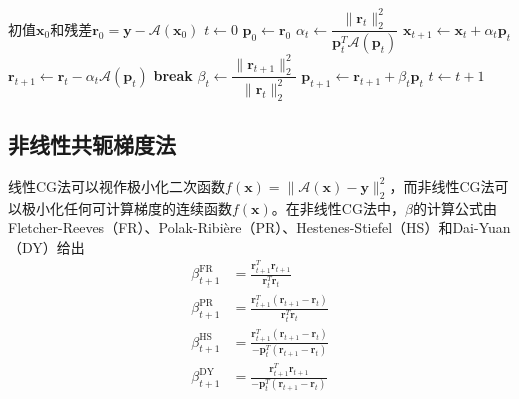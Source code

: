 \documentclass[12pt]{article}
\begin{document}
\begin{algorithm}[ht]
    \small
    \caption{求解$\bm{y}=\mathcal{A}(\bm{x})$的线性共轭梯度法}
    \label{alg:cg1}
    \begin{algorithmic}[1]
        \Require 初值$\bm{x}_0$和残差$\bm{r}_0=\bm{y}-\mathcal{A}(\bm{x}_0)$
        \State $t\gets0$
        \State $\bm{p}_0\gets\bm{r}_0$
        \Repeat
            \State $\alpha_t\gets\dfrac{\|\bm{r}_t\|_2^2}{\bm{p}_t^T\mathcal{A}(\bm{p}_t)}$ 
            \State $\bm{x}_{t+1}\gets\bm{x}_t+\alpha_t\bm{p}_t$
            \State $\bm{r}_{t+1}\gets\bm{r}_t-\alpha_t\mathcal{A}(\bm{p}_t)$ 
                \State \textbf{break}
            \EndIf
            \State $\beta_t\gets\dfrac{\|\bm{r}_{t+1}\|_2^2}{\|\bm{r}_t\|_2^2}$ 
            \State $\bm{p}_{t+1}\gets\bm{r}_{t+1}+\beta_t\bm{p}_t$
            \State $t\gets t+1$
    \end{algorithmic}
\end{algorithm}

\subsection{非线性共轭梯度法}
线性CG法可以视作极小化二次函数$f(\bm{x})=\|\mathcal{A}(\bm{x})-\bm{y}\|_2^2$，而非线性CG法可以极小化任何可计算梯度的连续函数$f(\bm{x})$。在非线性CG法中，$\beta$的计算公式由Fletcher-Reeves（FR）、Polak-Ribière（PR）、Hestenes-Stiefel（HS）和Dai-Yuan（DY）给出
\begin{align}
    \beta_{t+1}^{\mathrm{FR}}&=\frac{\bm{r}_{t+1}^T\bm{r}_{t+1}}{\bm{r}_t^T\bm{r}_t} \\
    \beta_{t+1}^{\mathrm{PR}}&=\frac{\bm{r}_{t+1}^T(\bm{r}_{t+1}-\bm{r}_t)}{\bm{r}_t^T\bm{r}_t} \\
    \beta_{t+1}^{\mathrm{HS}}&=\frac{\bm{r}_{t+1}^T(\bm{r}_{t+1}-\bm{r}_t)}{-\bm{p}_t^T(\bm{r}_{t+1}-\bm{r}_t)} \\
    \beta_{t+1}^{\mathrm{DY}}&=\frac{\bm{r}_{t+1}^T\bm{r}_{t+1}}{-\bm{p}_t^T(\bm{r}_{t+1}-\bm{r}_t)}
\end{align}
\end{document}
